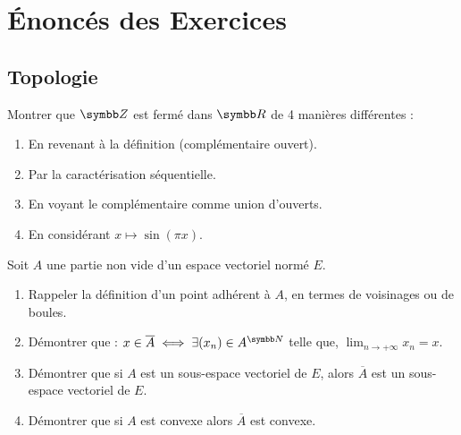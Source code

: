\section{Énoncés des Exercices}

\subsection{Topologie}
\begin{exercice}
    Montrer que $\Z$ est fermé dans $\R$ de 4 manières différentes :
    \begin{enumerate}
        \item En revenant à la définition (complémentaire ouvert).
        \item Par la caractérisation séquentielle.
        \item En voyant le complémentaire comme union d'ouverts.
        \item En considérant $x \mapsto \sin(\pi x)$.
    \end{enumerate}
\end{exercice}

\begin{exercice}
    Soit $A$ une partie non vide d'un espace vectoriel normé $E$.
    \begin{enumerate}
        \item Rappeler la définition d'un point adhérent à $A$, en termes de voisinages ou de boules.
        \item Démontrer que : $x \in \overline A \iff \exists (x_n) \in A^{\N}$ telle que, 
        $\lim_{n \rightarrow +\infty} x_n = x$.
        \item Démontrer que si $A$ est un sous-espace vectoriel de $E$, alors $\overline A$ est un sous-espace vectoriel de $E$.
        \item Démontrer que si $A$ est convexe alors $\overline A$ est convexe.
    \end{enumerate}
\end{exercice}

